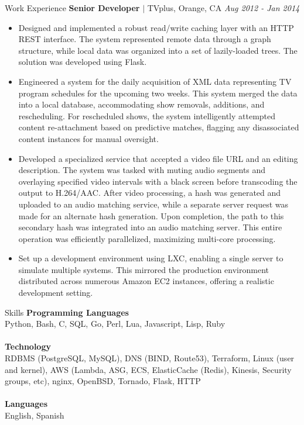 \documentclass{resume} %
\newcommand{\resumeItem}[1]{
  \item\small{
    {#1 \vspace{-2pt}}
  }
}
\newcommand{\resumeItemListStart}{\begin{itemize}}
\newcommand{\resumeItemListEnd}{\end{itemize}\vspace{-5pt}}
\begin{document}
\begin{rSection}{Work Experience}
{\bf Senior Developer}{ $|$ TVplus, Orange, CA} \hfill {\em Aug 2012 - Jan 2014}
\resumeItemListStart
    \resumeItem{Designed and implemented a robust read/write caching layer with an HTTP REST interface. The system represented remote data through a graph structure, while local data was organized into a set of lazily-loaded trees. The solution was developed using Flask.}
    \resumeItem{Engineered a system for the daily acquisition of XML data representing TV program schedules for the upcoming two weeks. This system merged the data into a local database, accommodating show removals, additions, and rescheduling. For rescheduled shows, the system intelligently attempted content re-attachment based on predictive matches, flagging any disassociated content instances for manual oversight.}
    \resumeItem{Developed a specialized service that accepted a video file URL and an editing description. The system was tasked with muting audio segments and overlaying specified video intervals with a black screen before transcoding the output to H.264/AAC. After video processing, a hash was generated and uploaded to an audio matching service, while a separate server request was made for an alternate hash generation. Upon completion, the path to this secondary hash was integrated into an audio matching server. This entire operation was efficiently parallelized, maximizing multi-core processing.}
    \resumeItem{Set up a development environment using LXC, enabling a single server to simulate multiple systems. This mirrored the production environment distributed across numerous Amazon EC2 instances, offering a realistic development setting.} \\
\resumeItemListEnd

\end{rSection}

\begin{rSection}{Skills}
{\bf Programming Languages }
\\Python, Bash, C, SQL, Go, Perl, Lua, Javascript, Lisp, Ruby\\\\
{\bf Technology }
\\RDBMS (PostgreSQL, MySQL), DNS (BIND, Route53), Terraform, Linux (user and kernel), AWS (Lambda, ASG, ECS, ElasticCache (Redis), Kinesis, Security groups, etc), nginx, OpenBSD, Tornado, Flask, HTTP\\\\
{\bf Languages}
\\English, Spanish
\end{rSection}
\end{document}
